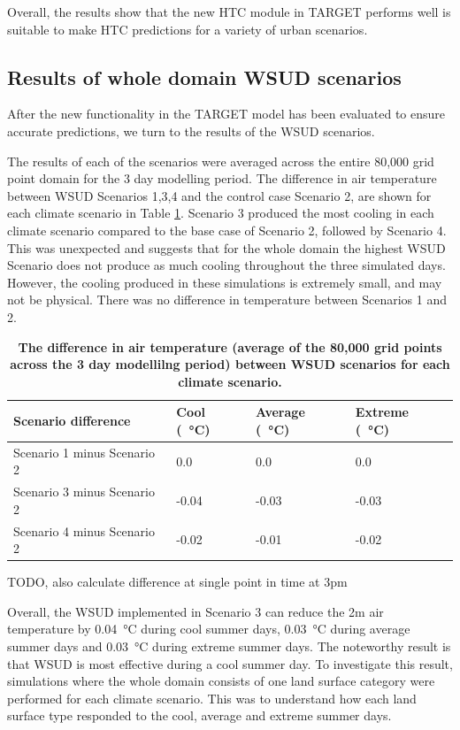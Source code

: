 \documentclass[final,3p,times,authoryear]{elsarticle}
\begin{document}
Overall, the results show that the new HTC module in TARGET performs well is suitable to make HTC predictions for a variety of urban scenarios.

\subsection{Results of whole domain WSUD scenarios}\label{sec:whole_domain}
After the new functionality in the TARGET model has been evaluated to ensure accurate predictions, we turn to the results of the WSUD scenarios. 

The results of each of the scenarios were averaged across the entire 80,000 grid point domain for the 3 day modelling period. The difference in air temperature between WSUD Scenarios 1,3,4 and the control case Scenario 2, are shown for each climate scenario in Table \ref{tab:scenarioDiff}. Scenario 3 produced the most cooling in each climate scenario compared to the base case of Scenario 2, followed by Scenario 4. This was unexpected and suggests that for the whole domain the highest WSUD Scenario does not produce as much cooling throughout the three simulated days. However, the cooling produced in these simulations is extremely small, and may not be physical. There was no difference in temperature between Scenarios 1 and 2. 


\begin{table}[!htbp]
\caption{\bf The difference in air temperature (average of the 80,000 grid points across the 3 day modellilng period) between WSUD scenarios for each climate scenario.  \label{tab:scenarioDiff}}     
\begin{tabular}{ l l l l}
\textbf{Scenario difference} & \textbf{Cool (\SI{}{\degreeCelsius})}
& \textbf{Average (\SI{}{\degreeCelsius})}
& \textbf{Extreme (\SI{}{\degreeCelsius})}\\ \hline
Scenario 1 minus Scenario 2 & 0.0  & 0.0 & 0.0\\ 
Scenario 3 minus Scenario 2 & -0.04  & -0.03 & -0.03\\ 
Scenario 4 minus Scenario 2 & -0.02  & -0.01 & -0.02\\ 
\hline
\end{tabular}
\end{table}

TODO, also calculate difference at single point in time at 3pm

Overall, the WSUD implemented in Scenario 3 can reduce the 2m air temperature by 0.04\SI{}{\degreeCelsius} during cool summer days, 0.03\SI{}{\degreeCelsius} during average summer days and 0.03\SI{}{\degreeCelsius} during extreme summer days. The noteworthy result is that WSUD is most effective during a cool summer day. To investigate this result, simulations where the whole domain consists of one land surface category were performed for each climate scenario. This was to understand how each land surface type responded to the cool, average and extreme summer days.
\end{document}
